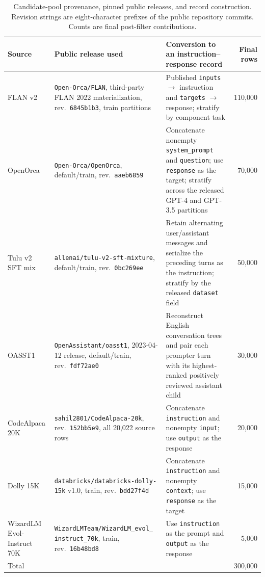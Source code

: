 \begin{table}[t]
\centering
\small
\setlength{\tabcolsep}{3pt}
\begin{tabular}{@{}>{\raggedright\arraybackslash}p{}
                    >{\raggedright\arraybackslash}p{}
                    >{\raggedright\arraybackslash}p{}r@{}}
\toprule
Source & Public release used & Conversion to an instruction--response record & Final rows \\
\midrule
FLAN v2~\cite{longpre2023flan} & \texttt{Open-Orca/FLAN}, third-party FLAN 2022
  materialization, rev.\ \texttt{6845b1b3}, train partitions & Published
  \texttt{inputs} $\rightarrow$ instruction and \texttt{targets}
  $\rightarrow$ response; stratify by component task & 110{,}000 \\
OpenOrca~\cite{lian2023openorca} & \texttt{Open-Orca/OpenOrca}, default/train,
  rev.\ \texttt{aaeb6859} & Concatenate nonempty \texttt{system\_prompt} and
  \texttt{question}; use \texttt{response} as the target; stratify across the
  released GPT-4 and GPT-3.5 partitions & 70{,}000 \\
Tulu v2 SFT mix~\cite{ivison2023camels} &
  \texttt{allenai/}\allowbreak\texttt{tulu-v2-sft-mixture}, default/train,
  rev.\ \texttt{0bc269ee} & Retain alternating user/assistant messages and
  serialize the preceding turns as the instruction; stratify by the released
  \texttt{dataset} field & 50{,}000 \\
OASST1~\cite{kopf2023openassistant} & \texttt{OpenAssistant/oasst1},
  2023-04-12 release, default/train, rev.\ \texttt{fdf72ae0} & Reconstruct
  English conversation trees and pair each prompter turn with its highest-ranked
  positively reviewed assistant child & 30{,}000 \\
CodeAlpaca 20K~\cite{chaudhary2023codealpaca} &
  \texttt{sahil2801/CodeAlpaca-20k}, rev.\ \texttt{152bb5e9}, all 20{,}022
  source rows & Concatenate \texttt{instruction} and nonempty \texttt{input};
  use \texttt{output} as the response & 20{,}000 \\
Dolly 15K~\cite{conover2023dolly} &
  \texttt{databricks/}\allowbreak\texttt{databricks-dolly-15k} v1.0, train,
  rev.\ \texttt{bdd27f4d} & Concatenate \texttt{instruction} and nonempty
  \texttt{context}; use \texttt{response} as the target & 15{,}000 \\
WizardLM Evol-Instruct 70K~\cite{xu2024wizardlm} &
  \texttt{WizardLMTeam/}\allowbreak\texttt{WizardLM\_evol\_}%
  \allowbreak\texttt{instruct\_70k}, train,
  rev.\ \texttt{16b48bd8} & Use \texttt{instruction} as the prompt and
  \texttt{output} as the response & 5{,}000 \\
\midrule
Total & & & 300{,}000 \\
\bottomrule
\end{tabular}
\caption{Candidate-pool provenance, pinned public releases, and record
construction. Revision strings are eight-character prefixes of the public
repository commits. Counts are final post-filter contributions.}
\label{tab:appendix-provenance}
\end{table}

